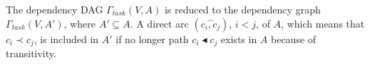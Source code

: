 \begin{mydef}
The dependency DAG $\Gamma_{task}(V,A)$ is reduced to the dependency graph $\Gamma_{task}(V,A')$, where $A' \subseteq A$. A direct arc $(\overset{\frown}{c_i,c_j})$, $i<j$, of $A$, which means that $c_i \prec c_j$, is included in $A'$ if no longer path $c_i \blacktriangleleft c_j$ exists in $A$ because of transitivity.
\end{mydef}







